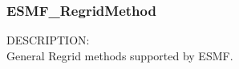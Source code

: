 
%
%


\subsubsection{ESMF\_RegridMethod}

{\sf DESCRIPTION:\\}
General Regrid methods supported by ESMF.

